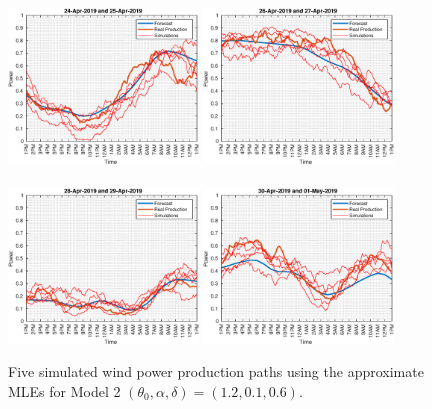 \documentclass[11pt]{article}
\theoremstyle{definition}
\begin{document}
\begin{figure}[H]
\centering
\includegraphics[width=0.45\textwidth]{../../MATLAB_Files/Results/paths_testing_days/optimal_value/1.eps}
\includegraphics[width=0.45\textwidth]{../../MATLAB_Files/Results/paths_testing_days/optimal_value/2.eps}\\
\quad\\
\includegraphics[width=0.45\textwidth]{../../MATLAB_Files/Results/paths_testing_days/optimal_value/3.eps}
\includegraphics[width=0.45\textwidth]{../../MATLAB_Files/Results/paths_testing_days/optimal_value/4.eps}
\caption{Five simulated wind power production paths using the approximate MLEs for Model 2 $(\theta_0, \alpha ,\delta)=(1.2,0.1,0.6)$. }
\label{fig:simulation_paths}
\end{figure}
\end{document}
